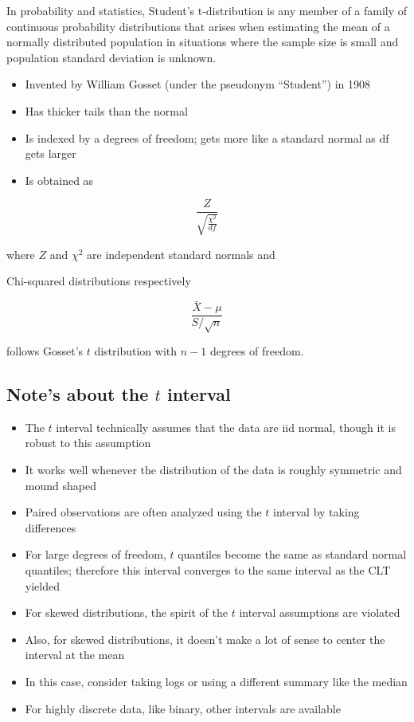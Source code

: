 \documentclass[]{article}
\begin{document}
In probability and statistics, Student's t-distribution is any member of
a family of continuous probability distributions that arises when
estimating the mean of a normally distributed population in situations
where the sample size is small and population standard deviation is
unknown.

\begin{itemize}
\item
  Invented by William Gosset (under the pseudonym ``Student'') in 1908
\item
  Has thicker tails than the normal
\item
  Is indexed by a degrees of freedom; gets more like a standard normal
  as df gets larger
\item
  Is obtained as
\end{itemize}

\[\frac{Z}{\sqrt{\frac{\chi^2}{df}}}\]

where \(Z\) and \(\chi^2\) are independent standard normals and

Chi-squared distributions respectively

\[\frac{\bar X - \mu}{S/\sqrt{n}}\]

follows Gosset's \(t\) distribution with \(n-1\) degrees of freedom.

\hypertarget{notes-about-the-t-interval}{%
\subsection{\texorpdfstring{Note's about the \(t\)
interval}{Note's about the t interval}}\label{notes-about-the-t-interval}}

\begin{itemize}
\item
  The \(t\) interval technically assumes that the data are iid normal,
  though it is robust to this assumption
\item
  It works well whenever the distribution of the data is roughly
  symmetric and mound shaped
\item
  Paired observations are often analyzed using the \(t\) interval by
  taking differences
\item
  For large degrees of freedom, \(t\) quantiles become the same as
  standard normal quantiles; therefore this interval converges to the
  same interval as the CLT yielded
\item
  For skewed distributions, the spirit of the \(t\) interval assumptions
  are violated
\item
  Also, for skewed distributions, it doesn't make a lot of sense to
  center the interval at the mean
\item
  In this case, consider taking logs or using a different summary like
  the median
\item
  For highly discrete data, like binary, other intervals are available
\end{itemize}
\end{document}
